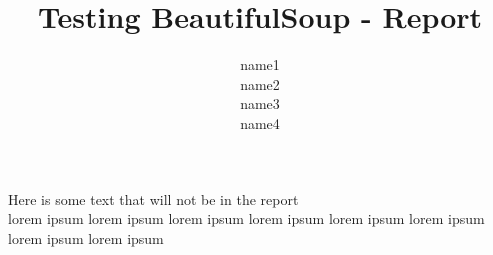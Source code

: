 \documentclass[10pt]{article}
\title{Testing BeautifulSoup - Report}
\author{name1 \\ name2 \\ name3 \\ name4}
\begin{document}
\maketitle

Here is some text that will not be in the report \\

lorem ipsum lorem ipsum lorem ipsum lorem ipsum lorem ipsum lorem ipsum lorem ipsum lorem ipsum
\end{document}
